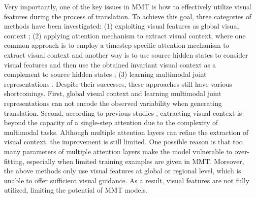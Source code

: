 \documentclass[sigconf]{acmart}
\begin{document}
Very importantly, 
one of the key issues in MMT is how to effectively utilize visual features during the process of translation. 
To achieve this goal, three categories of methods have been investigated: 
(1) exploiting visual features as global visual context \cite{huang2016attention,calixto2017incorporating,gronroos2018memad};
(2) applying attention mechanism to extract visual context, where 
one common approach is to employ a timestep-specific attention mechanism to extract visual context \cite{calixto2017doubly,delbrouck2017multimodal,helcl2018cuni} and 
another way is to use source hidden states to consider visual features and then use the obtained invariant visual context as a complement to source hidden states \cite{Delbrouck:NIPS17workshop,arslan2018doubly};   
(3) learning multimodal joint representations \cite{elliott2017imagination,zhou2018visual,calixto2019latent}. 
Despite their successes, 
these approaches still have various shortcomings. 
First, 
global visual context and learning multimodal joint representations can not encode the observed variability when generating translation. Second, 
according to previous studies \cite{lu2016hierarchical,wu2018you}, extracting visual context is beyond the capacity of a single-step attention due to the complexity of multimodal tasks. 
Although multiple attention layers can refine the extraction of visual context, the improvement is still limited. One possible reason is that too many parameters of multiple attention layers make the model vulnerable to over-fitting, especially when limited training examples are given in MMT. 
Moreover, the above methods only use visual features at global or regional level, which is unable to offer sufficient visual guidance. 
As a result, 
visual features are not fully utilized, limiting the potential of MMT models. 
\end{document}
